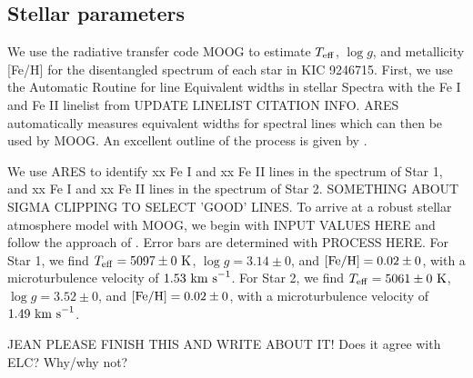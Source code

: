 \subsection{Stellar parameters}\label{parameters}
We use the radiative transfer code MOOG \citep{sne73} to estimate $T_{\rm{eff}}$, $\log g$, and metallicity [Fe/H] for the disentangled spectrum of each star in KIC 9246715. First, we use the Automatic Routine for line Equivalent widths in stellar Spectra \citep[ARES,][]{Sousa_2007} with the Fe I and Fe II linelist from \citet{Yong_2005} UPDATE LINELIST CITATION INFO. ARES automatically measures equivalent widths for spectral lines which can then be used by MOOG. An excellent outline of the process is given by \citet{Sousa_2014}.

We use ARES to identify xx Fe I and xx Fe II lines in the spectrum of Star 1, and xx Fe I and xx Fe II lines in the spectrum of Star 2. SOMETHING ABOUT SIGMA CLIPPING TO SELECT 'GOOD' LINES. To arrive at a robust stellar atmosphere model with MOOG, we begin with INPUT VALUES HERE and follow the approach of \citet{Mag13}. Error bars are determined with PROCESS HERE. For Star 1, we find $T_{\rm{eff}} = 5097 \pm 0 \ \rm{K}$, $\log g = 3.14 \pm 0$, and $\rm{[Fe/H]} = 0.02 \pm 0$, with a microturbulence velocity of $1.53 \ \rm{km \ s}^{-1}$. For Star 2, we find $T_{\rm{eff}} = 5061 \pm 0 \ \rm{K}$, $\log g = 3.52 \pm 0$, and $\rm{[Fe/H]} = 0.02 \pm 0$, with a microturbulence velocity of $1.49 \ \rm{km \ s}^{-1}$.

JEAN PLEASE FINISH THIS AND WRITE ABOUT IT! Does it agree with ELC? Why/why not?
    
    
    